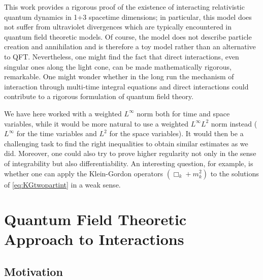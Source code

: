 \documentclass[b5paper,draft,openbib,12pt]{memoir}
\begin{document}
This work provides a rigorous proof of the existence of 
interacting relativistic quantum dynamics in 1+3 spacetime 
dimensions; in particular, this model does not suffer from 
ultraviolet divergences which are typically encountered in 
quantum field theoretic models. Of course, the model does not 
describe particle creation and annihilation and is therefore a 
toy model rather than an alternative to QFT. Nevertheless, one 
might find the fact that direct interactions, even singular ones 
along the light cone, can be made mathematically rigorous, 
remarkable. One might wonder whether in the long 
run the mechanism of 
interaction through multi-time integral equations and direct 
interactions could contribute to a rigorous formulation of 
quantum field theory.


We have here worked with a 
weighted $L^\infty$ norm both for time and space variables, 
while it would be more natural 
to use a weighted $L^\infty L^2$ norm 
instead ($L^\infty$ for the time variables and $L^2$ for the 
space variables). It would then be a challenging task to 
find the right inequalities to obtain similar estimates as we 
did. Moreover, one could also try to prove higher regularity 
not only in the sense of integrability but also 
differentiability. An interesting question, for example, 
is whether one can apply the Klein-Gordon operators 
$(\Box_k + m_k^2)$ to the solutions of \eqref{eq:KGtwopartint} in 
a weak sense. 







\chapter[Quantum Field Theoretic Approach to Interactions][Interaction in QFT]{Quantum Field Theoretic Approach to Interactions} \label{sec:QFT}

\section{Motivation}\label{sec: mot QED}
\end{document}
